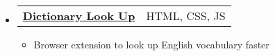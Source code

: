 \documentclass[letterpaper,11pt]{article}
\makeatletter
\newcommand{\subheading}[2]{
    \normalsize
    \begin{tabular*}{0.97\textwidth}[t]{l@{\extracolsep{\fill}}r}
      \textbf{#1} & #2 \\
    \end{tabular*}
    \vspace{-2pt}
}
\makeatother
\begin{document}
\begin{itemize}
        
        \item \subheading{\href{https://github.com/ngntrgduc/Dictionary-Look-Up}{Dictionary Look Up \faGithub}}
        {HTML, CSS, JS}
        \begin{itemize}
            \item Browser extension to look up English vocabulary faster
        \end{itemize}
        
    \end{itemize}
\end{document}
